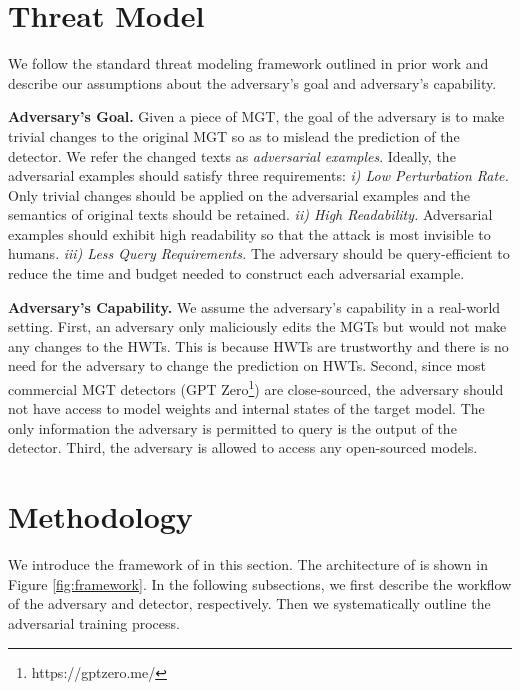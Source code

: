 \section{Threat Model}
We follow the standard threat modeling framework outlined in prior work \cite{biggio2018wild} and describe our assumptions about the adversary's goal and adversary's capability.

\noindent\textbf{Adversary's Goal.}\label{goal}
Given a piece of MGT, the goal of the adversary is to make trivial changes to the original MGT so as to mislead the prediction of the detector.
We refer the changed texts as \textit{adversarial examples}.
Ideally, the adversarial examples should satisfy three requirements:
\textit{i) Low Perturbation Rate.} 
Only trivial changes should be applied on the adversarial examples and the semantics of original texts should be retained.
\textit{ii) High Readability.}
Adversarial examples should exhibit high readability so that the attack is most invisible to humans.
\textit{iii) Less Query Requirements.}
The adversary should be query-efficient to reduce the time and budget needed to construct each adversarial example.
    
\noindent\textbf{Adversary's Capability. }
We assume the adversary's capability in a real-world setting.
First, an adversary only maliciously edits the MGTs but would not make any changes to the HWTs.
This is because HWTs are trustworthy and there is no need for the adversary to change the prediction on HWTs.
Second, since most commercial MGT detectors (\eg GPT Zero\footnote{https://gptzero.me/}) are close-sourced, the adversary should not have access to model weights and internal states of the target model.
The only information the adversary is permitted to query is the output of the detector.
Third, the adversary is allowed to access any open-sourced models.

\section{Methodology} \label{sec:generator}
We introduce the framework of \modelname in this section.
The architecture of \modelname is shown in Figure \ref{fig:framework}. 
In the following subsections, we first describe the workflow of the adversary and detector, respectively. 
Then we systematically outline the adversarial training process.


\begin{figure*}[htbp]
    \centering

    \caption{\textbf{Pipeline of \modelname.}
    The adversary identifies important tokens in the original MGT and generates candidates for important tokens (). The adversary conducts and refines the attack by greedy search and pruning (). The final adversarial examples are feeded to the target detector ()
    and participate in the adversarial training process ().}
    \vspace{-0.4cm}
    \label{fig:framework} 
\end{figure*}


